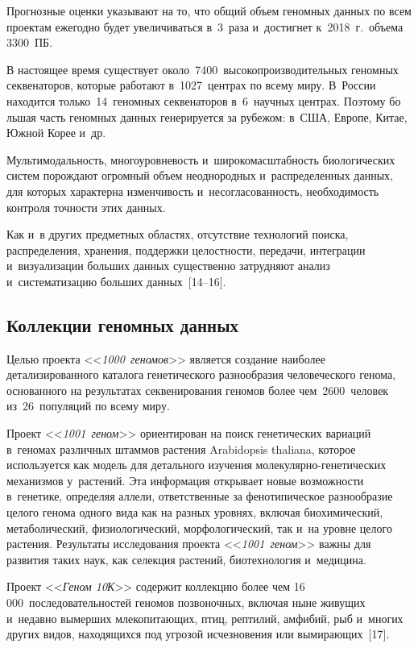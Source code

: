 \begin{multicols}{2}
  Прогнозные оценки указывают на то, что общий объем геномных данных по всем 
проектам ежегодно будет увеличиваться в~3~раза и~достигнет к~2018~г.\ объема 3300~ПБ.
  
  В настоящее время существует около~7400~высокопроизводительных геномных 
секвенаторов, которые работают в~1027~центрах по всему миру. В~России находится 
только~14~геномных секвенаторов в~6~научных центрах. Поэтому б$\acute{\mbox{о}}$льшая часть 
геномных данных генерируется за рубежом: в~США, Европе, Китае, Южной Корее и~др. 
  
  Мультимодальность, многоуровневость и~широкомасштабность биологических систем 
порождают огромный объем неоднородных и~распределенных данных, для которых 
характерна изменчивость и~несогласованность, необходимость контроля точности этих 
данных. 
  
  Как и~в других предметных областях, отсутствие технологий поиска, распределения, 
хранения, поддержки целостности, передачи, интеграции и~визуализации больших данных 
существенно затрудняют анализ и~систематизацию больших данных~[14--16].

\subsection{Коллекции геномных данных}
  
  Целью проекта <<\textit{1000~геномов}>> является создание наиболее 
детализированного каталога генетического разнообразия человеческого генома, 
основанного на результатах секвенирования геномов более чем~2600~человек 
из~26~популяций по всему миру. 
  
  Проект <<\textit{1001~геном}>> ориентирован на поиск генетиче\-ских вариаций 
в~геномах различных штаммов растения Arabidopsis thaliana, которое используется как 
модель для детального изучения мо\-ле\-ку\-ляр\-но-генетических механизмов у~растений. Эта 
информация открывает новые возможности в~генетике, определяя аллели, ответственные 
за фенотипическое разнообразие целого генома одного вида как на разных уровнях, 
включая биохимический, метаболический, физиологический, морфологический, так и~на 
уровне целого растения. Результаты исследования проекта <<\textit{1001~геном}>> важны 
для развития таких наук, как селекция растений, биотехнология и~медицина.
  
  Проект <<\textit{Геном 10К}>> содержит коллекцию более чем 
16\,000~последовательностей геномов позвоночных, включая ныне живущих и~недавно 
вымерших млекопитающих, птиц, рептилий, амфибий, рыб и~многих других видов, 
находящихся под угрозой исчезновения или вымирающих~[17].
  

\end{multicols}
